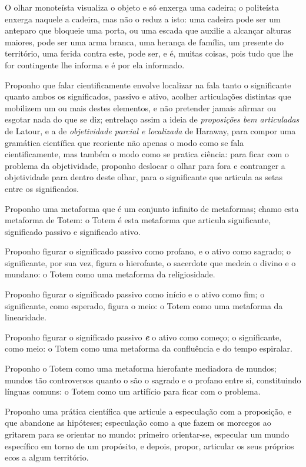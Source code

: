 O olhar monoteísta visualiza o objeto e só enxerga uma cadeira;
    o politeísta enxerga naquele a cadeira, mas não o reduz a isto:
        uma cadeira pode ser um anteparo que bloqueie uma porta, ou uma escada que auxilie a alcançar alturas maiores, pode ser uma arma branca, uma herança de família, um presente do território, uma ferida contra este, pode ser, e é, muitas coisas, pois tudo que lhe for contingente lhe informa e é por ela informado.

Proponho que falar cientificamente envolve localizar na fala tanto o significante quanto ambos os significados, passivo e ativo, acolher articulações distintas que mobilizem um ou mais destes elementos, e não pretender jamais afirmar ou esgotar nada do que se diz;
    entrelaço assim a ideia de \textit{proposições bem articuladas} de Latour, e a de \textit{objetividade parcial e localizada} de Haraway, para compor uma gramática científica que reoriente não apenas o modo como se fala cientificamente, mas também o modo como se pratica ciência:
        para ficar com o problema da objetividade, proponho deslocar o olhar para fora e contranger a objetividade para dentro deste olhar, para o significante que articula as setas entre os significados.

Proponho uma metaforma que é um conjunto infinito de metaformas;
    chamo esta metaforma de Totem:
        o Totem é esta metaforma que articula significante, significado passivo e significado ativo.

Proponho figurar o significado passivo como profano, e o ativo como sagrado;
    o significante, por sua vez, figura o hierofante, o sacerdote que medeia o divino e o mundano:
        o Totem como uma metaforma da religiosidade.
    
Proponho figurar o significado passivo como início e o ativo como fim;
    o significante, como esperado, figura o meio:
        o Totem como uma metaforma da linearidade.
    
Proponho figurar o significado passivo \textit{\textbf{e}} o ativo como começo; 
    o significante, como meio:
        o Totem como uma metaforma da confluência e do tempo espiralar.

Proponho o Totem como uma metaforma hierofante mediadora de mundos;
    mundos tão controversos quanto o são o sagrado e o profano entre si, constituindo línguas comuns:
        o Totem como um artifício para ficar com o problema.

Proponho uma prática científica que articule a especulação com a proposição, e que abandone as hipóteses;
    especulação como a que fazem os morcegos ao gritarem para se orientar no mundo:
        primeiro orientar-se, especular um mundo específico em torno de um propósito, e depois, propor, articular os seus próprios ecos a algum território.

